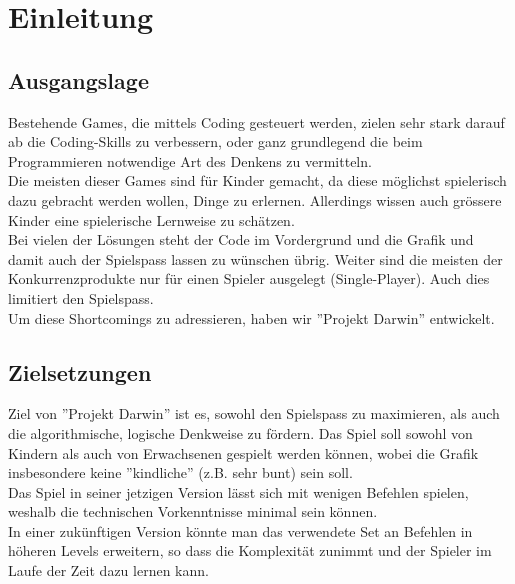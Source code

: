 \documentclass[11pt,a4paper,titlepage]{article}
\begin{document}

\newpage

\pagestyle{myheadings}

\section{Einleitung}
\subsection{Ausgangslage}


Bestehende Games, die mittels Coding gesteuert werden, zielen sehr stark darauf ab die Coding-Skills zu verbessern, oder ganz grundlegend die beim Programmieren notwendige Art des Denkens zu vermitteln.\\
Die meisten dieser Games sind für Kinder gemacht, da diese möglichst spielerisch dazu gebracht werden wollen, Dinge zu erlernen. Allerdings wissen auch grössere Kinder eine spielerische Lernweise zu schätzen. \\
Bei vielen der Lösungen steht der Code im Vordergrund und die Grafik und damit auch der Spielspass lassen zu wünschen übrig. 
Weiter sind die meisten der Konkurrenzprodukte nur für einen Spieler ausgelegt (Single-Player). Auch dies limitiert den Spielspass.\\
Um diese Shortcomings zu adressieren, haben wir ''Projekt Darwin'' entwickelt.

\subsection{Zielsetzungen}



Ziel von ''Projekt Darwin'' ist es, sowohl den Spielspass zu maximieren, als auch die algorithmische, logische Denkweise zu fördern. Das Spiel soll sowohl von Kindern als auch von Erwachsenen gespielt werden können, wobei die Grafik insbesondere keine ''kindliche'' (z.B. sehr bunt) sein soll.\\
Das Spiel in seiner jetzigen Version lässt sich mit wenigen Befehlen spielen, weshalb die technischen Vorkenntnisse minimal sein können.\\
In einer zukünftigen Version könnte man das verwendete Set an Befehlen in höheren Levels erweitern, so dass die Komplexität zunimmt und der Spieler im Laufe der Zeit dazu lernen kann.
\end{document}

